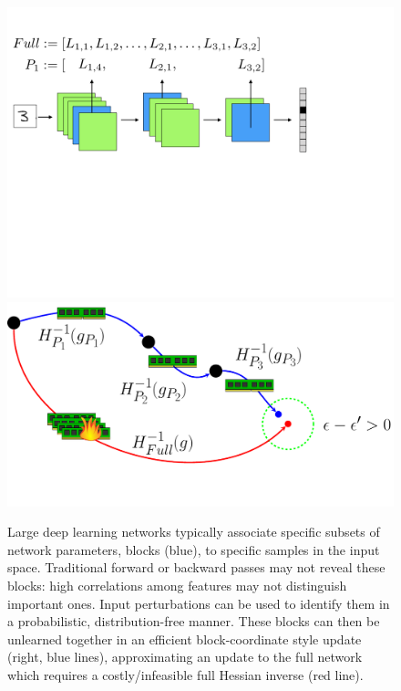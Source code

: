 \begin{figure}
    \centering
    \includegraphics[width=0.475\columnwidth,trim={0cm 12cm 5cm 2.5cm},clip]{5_unlearn/figs/layercnn.png}
    \includegraphics[width=0.425\columnwidth,trim={0cm 1cm 0cm 0cm},clip]{5_unlearn/figs/unlearning_fig.pdf}
    \caption[Conditionally independent network subsets and efficient unlearning]{\label{fig:main}Large deep learning networks typically associate specific subsets of network parameters, blocks (blue), to specific samples in the input space.
    Traditional forward or backward passes may not reveal these blocks: high correlations among features may not distinguish important ones. Input perturbations can be used to identify them in a probabilistic, distribution-free manner. These blocks can then be unlearned together in an efficient block-coordinate style update (right, blue lines), approximating an update to the full network which requires a costly/infeasible full Hessian inverse (red line).}
\end{figure}

